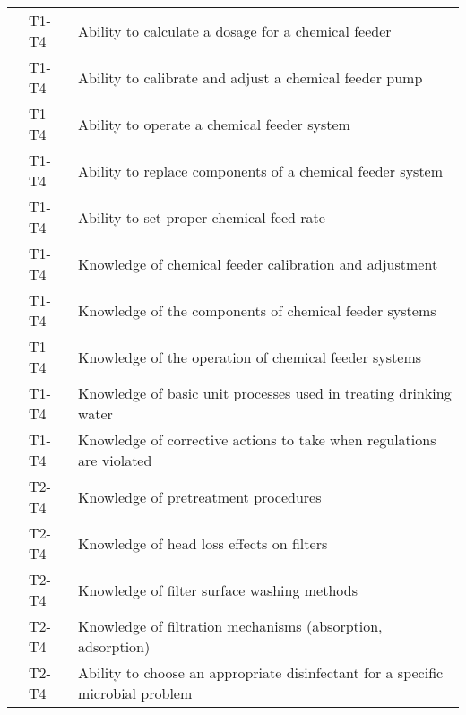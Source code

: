 \begin{table}[H]
\begin{tabular}{| m{1cm} | m{1cm} | m{12cm} |}
\multicolumn{1}{l|}{} & \multicolumn{1}{l|}{T1-T4} & Ability to calculate   a dosage for a chemical feeder                                      \\ \cline{2-3} 
\multicolumn{1}{l|}{} & \multicolumn{1}{l|}{T1-T4} & Ability to calibrate   and adjust a chemical feeder pump                                   \\ \cline{2-3} 
\multicolumn{1}{l|}{} & \multicolumn{1}{l|}{T1-T4} & Ability to operate a   chemical feeder system                                              \\ \cline{2-3} 
\multicolumn{1}{l|}{} & \multicolumn{1}{l|}{T1-T4} & Ability to replace   components of a chemical feeder system                                \\ \cline{2-3} 
\multicolumn{1}{l|}{} & \multicolumn{1}{l|}{T1-T4} & Ability to set proper   chemical feed rate                                                 \\ \cline{2-3} 
\multicolumn{1}{l|}{} & \multicolumn{1}{l|}{T1-T4} & Knowledge of chemical   feeder calibration and adjustment                                  \\ \cline{2-3} 
\multicolumn{1}{l|}{} & \multicolumn{1}{l|}{T1-T4} & Knowledge of the   components of chemical feeder systems                                   \\ \cline{2-3} 
\multicolumn{1}{l|}{} & \multicolumn{1}{l|}{T1-T4} & Knowledge of the   operation of chemical feeder systems                                    \\ \cline{2-3} 
\multicolumn{1}{l|}{} & \multicolumn{1}{l|}{T1-T4} & Knowledge of basic   unit processes used in treating drinking water                        \\ \cline{2-3} 
\multicolumn{1}{l|}{} & \multicolumn{1}{l|}{T1-T4} & Knowledge of   corrective actions to take when regulations are violated                    \\ \cline{2-3} 
\multicolumn{1}{l|}{} & \multicolumn{1}{l|}{T2-T4} & Knowledge of   pretreatment procedures                                                     \\ \cline{2-3} 
\multicolumn{1}{l|}{} & \multicolumn{1}{l|}{T2-T4} & Knowledge of head   loss effects on filters                                                \\ \cline{2-3} 
\multicolumn{1}{l|}{} & \multicolumn{1}{l|}{T2-T4} & Knowledge of filter   surface washing methods                                              \\ \cline{2-3} 
\multicolumn{1}{l|}{} & \multicolumn{1}{l|}{T2-T4} & Knowledge of   filtration mechanisms (absorption, adsorption)                              \\ \cline{2-3} 
\multicolumn{1}{l|}{} & \multicolumn{1}{l|}{T2-T4} & Ability to choose an   appropriate disinfectant for a specific microbial problem           \\ \cline{2-3} 
\end{tabular}
\end{table}
\newpage




